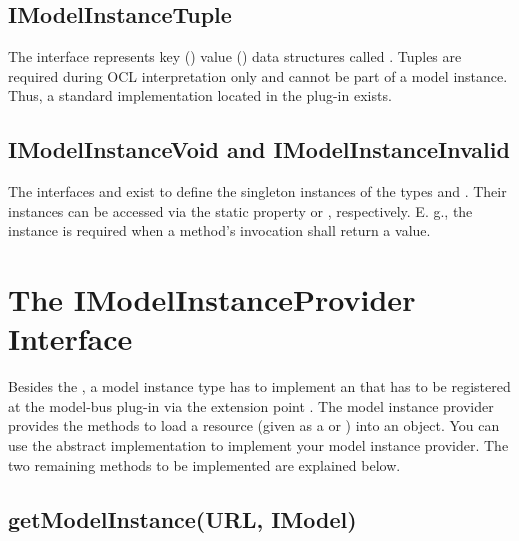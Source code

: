 \subsection{IModelInstanceTuple}

The interface  represents key
() value () data
structures called . Tuples are required during \acs{OCL} 
interpretation only and cannot be part of a model instance. Thus, a standard 
 implementation located in the plug-in 
 exists.


\subsection{IModelInstanceVoid and IModelInstanceInvalid}

The interfaces  and  exist 
to define the singleton instances of the types  and 
. Their instances can be accessed via the static property 
 or , 
respectively. E. g., the  instance is required when a 
method's invocation shall return a  value.



\section{The IModelInstanceProvider Interface}

Besides the , a model instance type has to 
implement an  that has to be registered at 
the model-bus plug-in via the extension point 
. The 
model instance provider provides the methods to load a resource (given as a 
 or ) into an  object. You can use the
abstract implementation  to implement your 
model instance provider. The two remaining methods to be implemented are 
explained below.


\subsection{getModelInstance(URL, IModel)}

